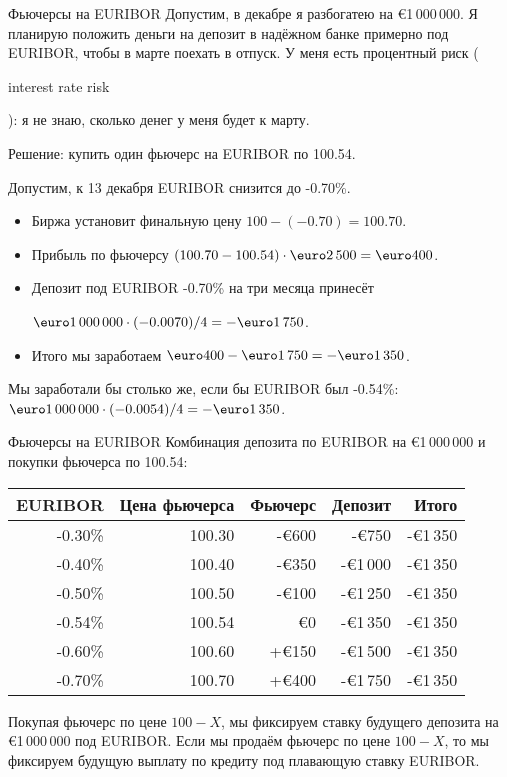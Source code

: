 \documentclass{beamer}
\renewcommand{\EUR}[1]{\textup{\euro}#1}
\newcommand{\en}[1]{\begin{otherlanguage}{english}#1\end{otherlanguage}}
\begin{document}
\begin{frame}{Фьючерсы на EURIBOR}
\justify
Допустим, в декабре я разбогатею на \EUR{1\,000\,000}. Я планирую положить деньги на депозит в надёжном банке примерно под EURIBOR, чтобы в марте поехать в отпуск. У меня есть \alert{процентный риск} (\en{interest rate risk}): я не знаю, сколько денег у меня будет к марту.

\justify
Решение: купить один фьючерс на EURIBOR по 100.54.

\justify
Допустим, к 13 декабря EURIBOR снизится до -0.70\%.
\begin{itemize}
\justifying
\item Биржа установит финальную цену $100 - (-0.70) = 100.70$.
\item Прибыль по фьючерсу $(100.70-100.54)\cdot\EUR{2\,500} = \EUR{400}$.
\item Депозит под EURIBOR -0.70\% на три месяца принесёт

$\EUR{1\,000\,000} \cdot (-0.0070) / 4 = -\EUR{1\,750}$.
\item Итого мы заработаем $\EUR{400} - \EUR{1\,750} = -\EUR{1\,350}$.
\end{itemize} 

\justify
Мы заработали бы столько же, если бы EURIBOR был -0.54\%: $\EUR{1\,000\,000} \cdot (-0.0054)/4 =-\EUR{1\,350}$.
\end{frame}



\begin{frame}{Фьючерсы на EURIBOR}
\justify
Комбинация депозита по EURIBOR на \EUR{1\,000\,000} и покупки фьючерса по 100.54:

\justify
\centering
\begin{tabular}{r|r|r|r|r}
EURIBOR & Цена фьючерса & Фьючерс    & Депозит & Итого \\ \hline
-0.30\% & 100.30        & -\EUR{600} & -\EUR{750}    & -\EUR{1\,350} \\
-0.40\% & 100.40        & -\EUR{350} & -\EUR{1\,000} & -\EUR{1\,350} \\
-0.50\% & 100.50        & -\EUR{100} & -\EUR{1\,250} & -\EUR{1\,350} \\
-0.54\% & 100.54        & \EUR{0}    & -\EUR{1\,350} & -\EUR{1\,350} \\
-0.60\% & 100.60        & +\EUR{150} & -\EUR{1\,500} & -\EUR{1\,350} \\
-0.70\% & 100.70        & +\EUR{400} & -\EUR{1\,750} & -\EUR{1\,350}
\end{tabular}

\justify
Покупая фьючерс по цене $100-X$, мы фиксируем ставку будущего депозита на \EUR{1\,000\,000} под EURIBOR. Если мы продаём фьючерс по цене $100-X$, то мы фиксируем будущую выплату по кредиту под плавающую ставку EURIBOR.
\end{frame}
\end{document}

